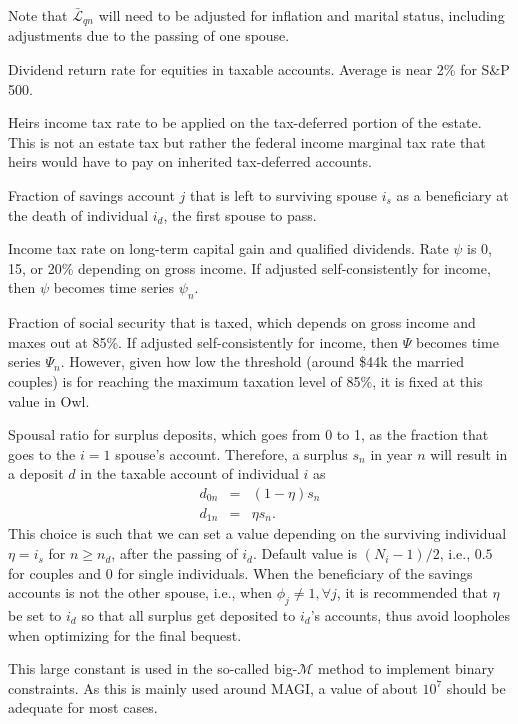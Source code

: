 \documentclass{report}[fleqn,11pt]
\begin{document}
\begin{description}[leftmargin=4em,style=multiline]
        Note that $\bar{\mathcal{L}}_{qn}$ will need to be adjusted for inflation and marital status,
        including adjustments due to the passing of one spouse.
\item [$\mu$]
	Dividend return rate for equities in taxable accounts. Average is near 2\% for S\&P 500.
\item [$\nu$]
	Heirs income tax rate to be applied on the tax-deferred portion of the estate. This is not an estate tax
	but rather the federal income marginal tax rate that heirs would have to pay on inherited tax-deferred accounts.
\item [$\phi_j$]
	Fraction of savings account $j$ that is left to surviving spouse $i_s$ as a beneficiary
	at the death of individual $i_d$, the first spouse to pass.
\item [$\psi$]
	Income tax rate on long-term capital gain and qualified dividends. Rate $\psi$ is 0, 15, or 20\%
	depending on gross income. If adjusted self-consistently for income, then $\psi$ becomes
 	time series $\psi_n$.
\item [$\Psi$]
	Fraction of social security that is taxed, which depends on gross income and maxes out at 85\%.
        If adjusted self-consistently for income, then $\Psi$ becomes time series $\Psi_n$. However,
	given how low the threshold (around \$44k the married couples) is for reaching the
	maximum taxation level of 85\%, it is fixed at this value in Owl.
\item [$\eta$]
	Spousal ratio for surplus deposits, which goes from 0 to 1, as the fraction
	that goes to the $i = 1$ spouse's account. Therefore, a surplus $s_n$ in year $n$
	will result in a deposit $d$ in the taxable account of individual $i$ as
	\begin{eqnarray}
		\label{Eq:eta}
		d_{0n} & = & (1 - \eta) s_n \nonumber\\
		d_{1n} & = & \eta s_n.
	\end{eqnarray}
	This choice is such that we can set a value depending on the surviving
	individual $\eta = i_s$ for $n \ge n_d$, after the passing of $i_d$.
	Default value is $(N_i - 1)/2$, i.e., $0.5$ for couples and $0$ for single individuals.
	When the beneficiary of the savings accounts is not the other spouse, i.e., 
	when $\phi_j \neq 1, \forall j$, it is recommended that $\eta$ be set to $i_d$ so that
	all surplus get deposited to $i_d$'s accounts,
	thus avoid loopholes when optimizing for the final bequest.
\item[$\mathcal{M}$]
	This large constant is used in the so-called big-$\mathcal{M}$ method to implement
	binary constraints. As this is mainly used around MAGI, a value of about $10^7$ should
	be adequate for most cases.
\end{description}
\end{document}
